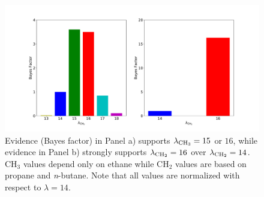 \documentclass[journal=jctc,manuscript=article]{achemso}
\begin{document}

\begin{figure}[htb!]
	\centering
	\includegraphics[width=4.8in]{Evidence_Mie_CH3_CH2}
	\caption{Evidence (Bayes factor) in Panel a) supports $\lambda_{\rm CH_3} =15 $ or $16$, while evidence in Panel b) strongly supports $\lambda_{\rm CH_2} = 16$ over $\lambda_{\rm CH_2} = 14$. CH$_3$ values depend only on ethane while CH$_2$ values are based on propane and \textit{n}-butane. Note that all values are normalized with respect to $\lambda = 14$.}
	\label{fig:Bayes_Factors}
\end{figure}

\end{document}
